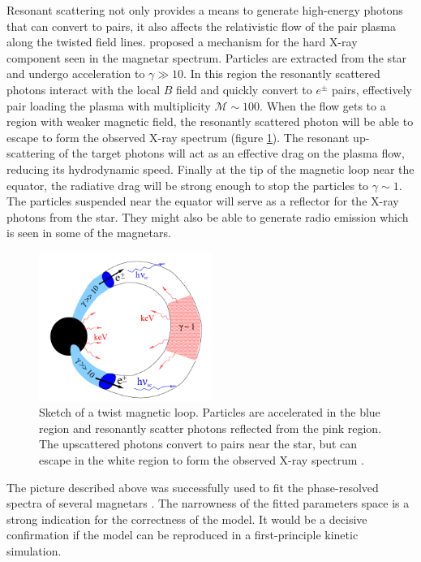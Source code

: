 Resonant scattering not only provides a means to generate high-energy photons
that can convert to pairs, it also affects the relativistic flow of the pair
plasma along the twisted field lines. \citet{beloborodov_mechanism_2013}
proposed a mechanism for the hard X-ray component seen in the magnetar spectrum.
Particles are extracted from the star and undergo acceleration to $\gamma\gg
10$. In this region the resonantly scattered photons interact with the local $B$
field and quickly convert to $e^{\pm}$ pairs, effectively pair loading the
plasma with multiplicity $\mathcal{M}\sim 100$. When the flow gets to a region
with weaker magnetic field, the resonantly scattered photon will be able to
escape to form the observed X-ray spectrum (figure \ref{fig:magnetar-loop}). The
resonant up-scattering of the target photons will act as an effective drag on
the plasma flow, reducing its hydrodynamic speed. Finally at the tip of the
magnetic loop near the equator, the radiative drag will be strong enough to stop
the particles to $\gamma \sim 1$. The particles suspended near the equator will
serve as a reflector for the X-ray photons from the star. They might also be
able to generate radio emission which is seen in some of the magnetars.

\begin{figure}[h]
  \centering
  \includegraphics[width=0.5\textwidth]{pics/intro/magnetar-loop.png}
  \caption[Sketch of a twist magnetic loop.]{Sketch of a twist magnetic loop.
    Particles are accelerated in the blue region and resonantly scatter photons
    reflected from the pink region. The upscattered photons convert to pairs
    near the star, but can escape in the white region to form the observed X-ray
    spectrum \citep{beloborodov_mechanism_2013}.}
  \label{fig:magnetar-loop}
\end{figure}

The picture described above was successfully used to fit the phase-resolved
spectra of several magnetars \citep{hascoet_phase-resolved_2014}. The narrowness
of the fitted parameters space is a strong indication for the correctness of the
model. It would be a decisive confirmation if the model can be reproduced in a
first-principle kinetic simulation.

